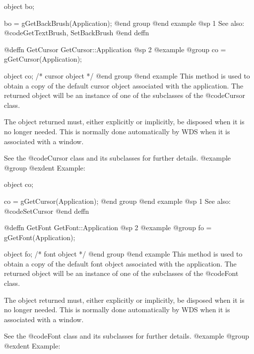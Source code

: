 object  bo;

bo = gGetBackBrush(Application);
@end group
@end example
@sp 1
See also:  @code{GetTextBrush, SetBackBrush}
@end deffn























@deffn {GetCursor} GetCursor::Application
@sp 2
@example
@group
co = gGetCursor(Application);

object  co;     /*  cursor object  */
@end group
@end example
This method is used to obtain a copy of the default cursor object
associated with the application.  The returned object will be an
instance of one of the subclasses of the @code{Cursor} class.

The object returned must, either explicitly or implicitly, be
disposed when it is no longer needed.  This is normally done
automatically by WDS when it is associated with a window.

See the @code{Cursor} class and its subclasses for further details.
@example
@group
@exdent Example:

object  co;

co = gGetCursor(Application);
@end group
@end example
@sp 1
See also:  @code{SetCursor}
@end deffn
















@deffn {GetFont} GetFont::Application
@sp 2
@example
@group
fo = gGetFont(Application);

object  fo;     /*  font object  */
@end group
@end example
This method is used to obtain a copy of the default font object
associated with the application.  The returned object will be an
instance of one of the subclasses of the @code{Font} class.

The object returned must, either explicitly or implicitly, be
disposed when it is no longer needed.  This is normally done
automatically by WDS when it is associated with a window.

See the @code{Font} class and its subclasses for further details.
@example
@group
@exdent Example:

